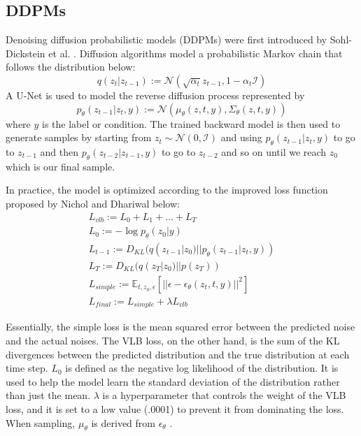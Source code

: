 \documentclass[11pt]{article}
\begin{document}
\subsection{DDPMs}
Denoising diffusion probabilistic models (DDPMs) were first
introduced by Sohl-Dickstein et al. \cite{sohldickstein2015deepunsupervisedlearningusing}. Diffusion 
algorithms model a probabilistic Markov chain that follows the distribution below:
\begin{equation}
    q(z_t | z_{t - 1}) := \mathcal{N}(\sqrt{\alpha_t}z_{t - 1}, 1-\alpha_t \mathcal{I}) 
\end{equation}
A U-Net is used to model the reverse diffusion process 
represented by 
\begin{equation}
    p_{\theta}(z_{t-1} | z_t, y) := \mathcal{N}(\mu_{\theta}(z, t, y), \Sigma_{\theta}(z, t, y))
\end{equation}
where $y$ is the label or condition. The trained backward 
model is then used to generate samples by starting from 
$z_t \sim \mathcal{N}(0, \mathcal{I})$ and using 
$p_{\theta}(z_{t-1} | z_t, y)$ to go to $z_{t-1}$ and then $p_{\theta}(z_{t-2} | z_{t-1}, y)$ to go to $z_{t-2}$ and so on
until we reach $z_0$ which is our final sample.

In practice, the model is optimized according to the improved loss function
proposed by Nichol and Dhariwal \cite{nichol2021improveddenoisingdiffusionprobabilistic} below:
\begin{gather}
    L_{vlb} := L_0 + L_1 + \dots + L_T \\
    L_0 := -\log p_{\theta}(z_0 | y) \\
    L_{t-1} := D_{KL}(q(z_{t-1} | z_0) || p_{\theta}(z_{t-1} | z_t, y)) \\
    L_{T} := D_{KL}(q(z_{T} | z_0) || p(z_{T})) \\
    L_{simple} := \mathbb{E}_{t, z_0, \epsilon}[||\epsilon - \epsilon_{\theta}(z_t, t, y)||^2] \\
    L_{final} := L_{simple} + \lambda L_{vlb}
\end{gather}

Essentially, the simple loss is the mean squared error between the predicted 
noise and the actual noises. The VLB loss, on the other hand, is the sum of the 
KL divergences between the predicted distribution and the true distribution at each time 
step. $L_0$ is defined as the negative log likelihood of the distribution. It 
is used to help the model learn the standard deviation of the distribution rather than just the mean.
$\lambda$ is a hyperparameter that controls the weight of the VLB loss, and it is 
set to a low value (.0001) to prevent it from dominating the loss.
When sampling, $\mu_{\theta}$ is derived from $\epsilon_{\theta}$ \cite{ho2020denoisingdiffusionprobabilisticmodels}.
\end{document}
